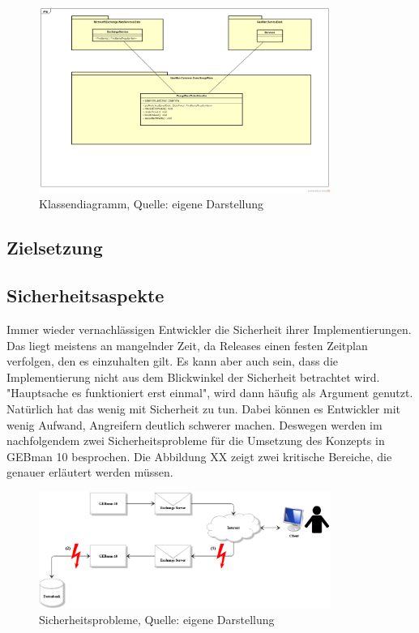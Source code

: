 \begin{figure}[h!]
\centering
\includegraphics[width=0.85\textwidth]{Abbildungen/Klassendiagramm.png}
	\caption[Klassendiagramm]{Klassendiagramm, Quelle: eigene Darstellung}
	\label{fig:Klassendiagramm}
\end{figure}




\subsection{Zielsetzung}
\subsection{Sicherheitsaspekte}
\noindent
Immer wieder vernachlässigen Entwickler die Sicherheit ihrer Implementierungen. Das liegt meistens an mangelnder Zeit, da Releases einen festen Zeitplan verfolgen, den es einzuhalten gilt. Es kann aber auch sein, dass die Implementierung nicht aus dem Blickwinkel der Sicherheit betrachtet wird. "Hauptsache es funktioniert erst einmal", wird dann häufig als Argument genutzt. Natürlich hat das wenig mit Sicherheit zu tun. Dabei können es Entwickler mit wenig Aufwand, Angreifern deutlich schwerer machen. Deswegen werden im nachfolgendem zwei Sicherheitsprobleme für die Umsetzung des Konzepts in GEBman 10 besprochen. Die Abbildung XX zeigt zwei kritische Bereiche, die genauer erläutert werden müssen.

\begin{figure}[h!]
\centering
\includegraphics[width=0.85\textwidth]{Abbildungen/Sicherheitsprobleme.png}
	\caption[Sicherheitsprobleme]{Sicherheitsprobleme, Quelle: eigene Darstellung}
	\label{fig:Sicherheitsprobleme}
\end{figure}

